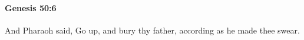 
		\paragraph{Genesis 50:6} %
			\label{GENESIS-50-6}

			And Pharaoh said, Go up, and bury thy father, according as he made thee swear.


